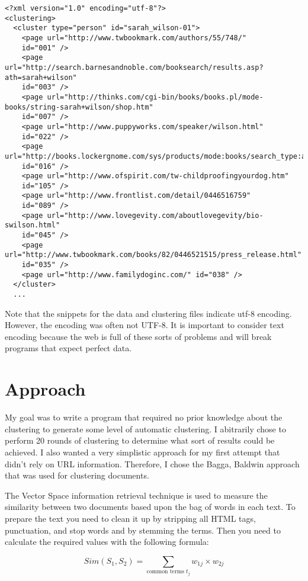 \documentclass[12pt,twoside,letterpaper]{article}
\begin{document}
\begin{verbatim}
<?xml version="1.0" encoding="utf-8"?>
<clustering>
  <cluster type="person" id="sarah_wilson-01">
    <page url="http://www.twbookmark.com/authors/55/748/"
    id="001" />
    <page url="http://search.barnesandnoble.com/booksearch/results.asp?ath=sarah+wilson"
    id="003" />
    <page url="http://thinks.com/cgi-bin/books/books.pl/mode-books/string-sarah+wilson/shop.htm"
    id="007" />
    <page url="http://www.puppyworks.com/speaker/wilson.html"
    id="022" />
    <page url="http://books.lockergnome.com/sys/products/mode:books/search_type:authorsearch/input_string:sarah+wilson/locale:us"
    id="016" />
    <page url="http://www.ofspirit.com/tw-childproofingyourdog.htm"
    id="105" />
    <page url="http://www.frontlist.com/detail/0446516759"
    id="089" />
    <page url="http://www.lovegevity.com/aboutlovegevity/bio-swilson.html"
    id="045" />
    <page url="http://www.twbookmark.com/books/82/0446521515/press_release.html"
    id="035" />
    <page url="http://www.familydoginc.com/" id="038" />
  </cluster>
  ...
\end{verbatim}

Note that the snippets for the data and clustering files indicate utf-8 encoding. However, the encoding was often not UTF-8. It is important to consider text encoding because the web is full of these sorts of problems and will break programs that expect perfect data.

\section{Approach}

My goal was to write a program that required no prior knowledge about the clustering to generate some level of automatic clustering. I abitrarily chose to perform 20 rounds of clustering to determine what sort of results could be achieved. I also wanted a very simplistic approach for my first attempt that didn't rely on URL information. Therefore, I chose the Bagga, Baldwin approach that was used for clustering documents. 

The Vector Space information retrieval technique is used to measure the similarity between two documents based upon the bag of words in each text. To prepare the text you need to clean it up by stripping all HTML tags, punctuation, and stop words and by stemming the terms. Then you need to calculate the required values with the following formula:

$$Sim(S_1, S_2) = \sum_{\mbox{common terms }t_j}w_{1j} \times w_{2j}$$
\end{document}
